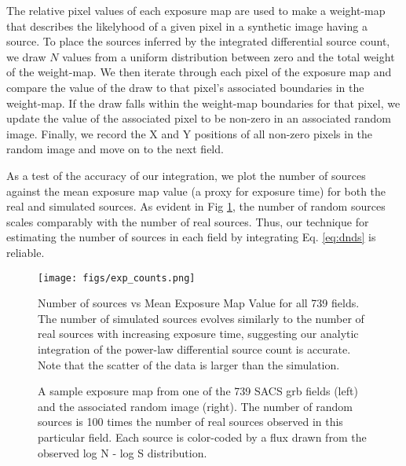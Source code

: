 \documentclass[preprint]{aastex63}
\begin{document}
The relative pixel values of each exposure map are used to make a weight-map that describes the 
likelyhood of a given pixel in a synthetic image having a source. To place the sources inferred by the integrated differential source count,
we draw $N$ values from a uniform distribution between zero and the total weight of the 
weight-map. We then iterate through each pixel of the exposure map and compare the value of the draw to that pixel's
associated boundaries in the weight-map. If the draw falls within the weight-map boundaries for that pixel,
we update the value of the associated pixel to be non-zero in an associated random image. Finally, we record the X and Y positions of all 
non-zero pixels in the random image and move on to the next field.


As a test of the accuracy of our integration, we plot the number of sources against the mean exposure map value
(a proxy for exposure time) for both the real and simulated sources. As evident in Fig \ref{fig:exp_counts}, the number of random sources scales
comparably with the number of real sources. Thus, our technique for estimating the number of sources in each field by integrating
Eq. \ref{eq:dnds} is reliable.

\begin{figure}[!ht]
    \centering
    \texttt{[image: figs/exp\_counts.png]}
    \label{fig:exp_counts}
    \caption{Number of sources vs Mean Exposure Map Value for all 739 fields. The number of simulated sources
    evolves similarly to the number of real sources with increasing exposure time, suggesting our analytic integration of the power-law
    differential source count is accurate. Note that the scatter of the data is larger than the simulation. }
\end{figure}


\begin{figure}[!ht]
    \centering
    
    \label{fig:exp_map}
    \caption{A sample exposure map from one of the 739 SACS grb fields (left) and the associated random image (right). 
    The number of random sources is 100 times the number of real sources observed in this particular field. Each source
    is color-coded by a flux drawn from the observed log N - log S distribution. }
\end{figure}
\end{document}

